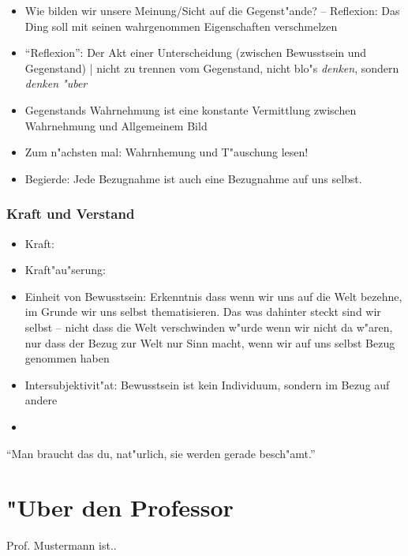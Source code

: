 \documentclass[emulatestandardclasses]{scrartcl}
\begin{document}
\begin{itemize}
  \item Wie bilden wir unsere Meinung/Sicht auf die Gegenst"ande? -- Reflexion: Das Ding soll mit seinen wahrgenommen Eigenschaften verschmelzen
  \item "`Reflexion"': Der Akt einer Unterscheidung (zwischen Bewusstsein und Gegenstand) | nicht zu trennen vom Gegenstand, nicht blo"s \emph{denken}, sondern \emph{denken "uber}
  \item Gegenstands Wahrnehmung ist eine konstante Vermittlung zwischen Wahrnehmung und Allgemeinem Bild
  \item Zum n"achsten mal: Wahrnhemung und T"auschung lesen!
  \item Begierde: Jede Bezugnahme ist auch eine Bezugnahme auf uns selbst.
\end{itemize}


\subsubsection{Kraft und Verstand}

\begin{itemize}
  \item Kraft: 
  \item Kraft"au"serung: 
  \item Einheit von Bewusstsein: Erkenntnis dass wenn wir uns auf die Welt bezehne, im Grunde wir uns selbst thematisieren. Das was dahinter steckt sind wir selbst -- nicht dass die Welt verschwinden w"urde wenn wir nicht da w"aren, nur dass der Bezug zur Welt nur Sinn macht, wenn wir auf uns selbst Bezug genommen haben
  \item Intersubjektivit"at: Bewusstsein ist kein Individuum, sondern im Bezug auf andere
  \item 
\end{itemize}

"`Man braucht das du, nat"urlich, sie werden gerade besch"amt."'

\newpage
\section{"Uber den Professor}
Prof. Mustermann ist..


\end{document}
